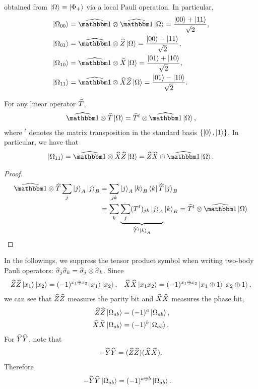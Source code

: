 \noindent obtained from  $\ket{\Omega}\equiv \ket{\Phi_+}$ via a local Pauli operation. In particular,
\begin{align}
	\ket{\Omega_{00}} &= \op\id\otimes\op\id\ket{\Omega} = \frac{\ket{00}+\ket{11}}{\sqrt{2}}, \\
	\ket{\Omega_{01}} &= \op\id\otimes\op Z\ket{\Omega}= \frac{\ket{00}-\ket{11}}{\sqrt{2}}, \\
	\ket{\Omega_{10}} &= \op\id\otimes\op X\ket{\Omega}= \frac{\ket{01}+\ket{10}}{\sqrt{2}}, \\
	\ket{\Omega_{11}} &= \op\id\otimes\op X \op Z\ket{\Omega}= \frac{\ket{01}-\ket{10}}{\sqrt{2}}.
\end{align}

\begin{lemma}\label{}
	For any linear operator $\widehat{T}$,
	\begin{align}
		\op\id\otimes \op T\ket{\Omega} = \op T^t \otimes \op\id \ket{\Omega},
	\end{align}
	where $^t$ denotes the matrix transposition in the standard basis $\{\ket{0},\ket{1}\}$. In particular, we have that
	\begin{align}
		\ket{\Omega_{11}} = \op\id\otimes \op X\op Z\ket{\Omega} = \op Z\op X \otimes \op\id \ket{\Omega}.
	\end{align}
\end{lemma}

\begin{proof}
    \begin{align}
       \op\id\otimes\op T\sum_j \ket{j}_A \ket{j}_B &= \sum_{jk} \ket{j}_A \ket{k}_B\bra{k} \op T \ket{j}_B \\
       &= \sum_k \underbrace{\sum_j  (T^t)_{jk} \ket{j}_A}_{\op T^t \ket{k}_A}\ket{k}_B
       = \op T^t \otimes \op\id \ket{\Omega}
    \end{align} 
\end{proof}


In the followings, we suppress the tensor product symbol when writing two-body Pauli operators: $\widehat{\sigma}_j \widehat{\sigma}_k = \widehat{\sigma}_j \otimes \widehat{\sigma}_k$.
Since
\begin{align}
	\widehat{Z}\widehat{Z}\ket{x_1}\ket{x_2}=(-1)^{x_1\oplus x_2}\ket{x_1}\ket{x_2}, && 
	\widehat{X}\widehat{X}\ket{x_1x_2}=(-1)^{x_1\oplus x_2}\ket{x_1\oplus 1}\ket{x_2\oplus 1},
\end{align}
we can see that $\widehat{Z} \widehat{Z}$ measures the parity bit and $\widehat{X} \widehat{X}$ measures the phase bit,
\begin{align}
	\widehat{Z}\widehat{Z} \ket{\Omega_{ab}} &= (-1)^a \ket{\Omega_{ab}}, \\
	\widehat{X}\widehat{X} \ket{\Omega_{ab}} &= (-1)^b \ket{\Omega_{ab}}.
\end{align}
For $\widehat{Y} \widehat{Y}$, note that
\begin{align}
	-\widehat{Y} \widehat{Y} =  (\widehat{Z} \widehat{Z})(\widehat{X} \widehat{X}).
\end{align}
Therefore
\begin{align}
		-\widehat{Y}\widehat{Y} \ket{\Omega_{ab}} &= (-1)^{a\oplus b} \ket{\Omega_{ab}}.
\end{align}


